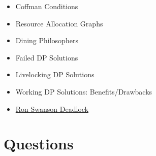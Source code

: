 \begin{itemize}
	\item Coffman Conditions
	\item Resource Allocation Graphs
	\item Dining Philosophers
	\item Failed DP Solutions
	\item Livelocking DP Solutions
	\item Working DP Solutions: Benefits/Drawbacks
	\item \href{http://adit.io/posts/2013-05-11-The-Dining-Philosophers-Problem-With-Ron-Swanson.html}{Ron Swanson Deadlock}
\end{itemize}

\section{Questions}

